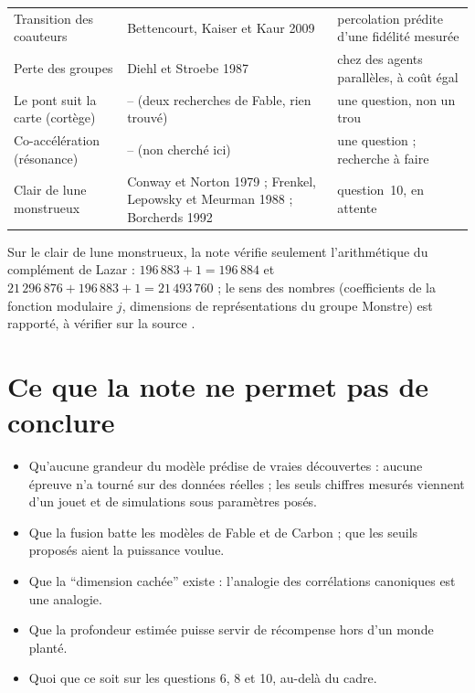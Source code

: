\documentclass[11pt,a4paper]{article}
\theoremstyle{definition}
\theoremstyle{plain}
\begin{document}
\begin{longtable}{@{}p{}p{}p{}@{}}
Transition des coauteurs & Bettencourt, Kaiser et Kaur 2009 \cite{bettencourt2009} & percolation prédite d'une fidélité mesurée \\
Perte des groupes & Diehl et Stroebe 1987 \cite{diehlstroebe1987} & chez des agents parallèles, à coût égal \\
Le pont suit la carte (cortège) & -- (deux recherches de Fable, rien trouvé) & une question, non un trou \\
Co-accélération (résonance) & -- (non cherché ici) & une question ; recherche à faire \\
Clair de lune monstrueux & Conway et Norton 1979 \cite{conwaynorton1979} ; Frenkel, Lepowsky et Meurman 1988 \cite{flm1988} ; Borcherds 1992 \cite{borcherds1992} & question~10, en attente \\
\bottomrule
\end{longtable}

Sur le clair de lune monstrueux, la note vérifie seulement l'arithmétique du complément de Lazar :
$196\,883+1=196\,884$ et $21\,296\,876+196\,883+1=21\,493\,760$ ; le sens des nombres (coefficients de
la fonction modulaire $j$, dimensions de représentations du groupe Monstre) est rapporté, à vérifier
sur la source \cite{conwaynorton1979}.

\section{Ce que la note ne permet pas de conclure}
\label{sec:limites}

\begin{itemize}
\item Qu'aucune grandeur du modèle prédise de vraies découvertes : aucune épreuve n'a tourné sur
des données réelles ; les seuls chiffres mesurés viennent d'un jouet et de simulations sous
paramètres posés.
\item Que la fusion batte les modèles de Fable et de Carbon ; que les seuils proposés aient la
puissance voulue.
\item Que la \enquote{dimension cachée} existe : l'analogie des corrélations canoniques est une
analogie.
\item Que la profondeur estimée puisse servir de récompense hors d'un monde planté.
\item Quoi que ce soit sur les questions 6, 8 et 10, au-delà du cadre.
\end{itemize}

\appendix
\end{document}
